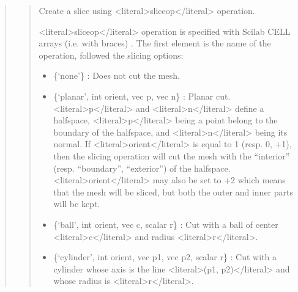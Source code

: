 \documentclass[a4paper,11pt,english]{sphinxmanual}
\begin{document}
\sphinxAtStartPar
{}
\begin{quote}

\sphinxAtStartPar
{}
\begin{quote}

\sphinxAtStartPar
Create a slice using \textless{}literal\textgreater{}sliceop\textless{}/literal\textgreater{} operation.

\sphinxAtStartPar
\textless{}literal\textgreater{}sliceop\textless{}/literal\textgreater{} operation is specified with Scilab CELL arrays (i.e. with braces) . The first element is the
name of the operation, followed the slicing options:
\begin{itemize}
\item {} 
\sphinxAtStartPar
\{‘none’\} :
Does not cut the mesh.

\item {} 
\sphinxAtStartPar
\{‘planar’, int orient, vec p, vec n\} :
Planar cut. \textless{}literal\textgreater{}p\textless{}/literal\textgreater{} and \textless{}literal\textgreater{}n\textless{}/literal\textgreater{} define a half\sphinxhyphen{}space, \textless{}literal\textgreater{}p\textless{}/literal\textgreater{} being a point belong to
the boundary of the half\sphinxhyphen{}space, and \textless{}literal\textgreater{}n\textless{}/literal\textgreater{} being its normal. If \textless{}literal\textgreater{}orient\textless{}/literal\textgreater{} is
equal to \sphinxhyphen{}1 (resp. 0, +1), then the slicing operation will cut the mesh
with the “interior” (resp. “boundary”, “exterior”) of the half\sphinxhyphen{}space.
\textless{}literal\textgreater{}orient\textless{}/literal\textgreater{} may also be set to +2 which means that the mesh will be sliced,
but both the outer and inner parts will be kept.

\item {} 
\sphinxAtStartPar
\{‘ball’, int orient, vec c, scalar r\} :
Cut with a ball of center \textless{}literal\textgreater{}c\textless{}/literal\textgreater{} and radius \textless{}literal\textgreater{}r\textless{}/literal\textgreater{}.

\item {} 
\sphinxAtStartPar
\{‘cylinder’, int orient, vec p1, vec p2, scalar r\} :
Cut with a cylinder whose axis is the line \textless{}literal\textgreater{}(p1, p2)\textless{}/literal\textgreater{} and whose radius
is \textless{}literal\textgreater{}r\textless{}/literal\textgreater{}.


\end{itemize}
\end{quote}
\end{quote}
\end{document}
